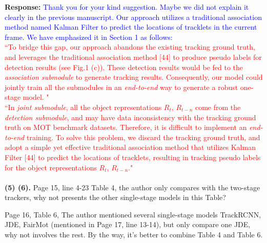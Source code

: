 \documentclass[12pt,journal,onecolumn]{IEEEtran}
\begin{document}
\textbf{Response:} \textcolor{blue}{Thank you for your kind suggestion.
Maybe we did not explain it clearly in the previous manuscript. 
Our approach utilizes a traditional association method named Kalman Filter to predict the locations of tracklets in the current frame. 
We have emphasized it in Section 1 as follows: \\
}
\textcolor{red}{
``To bridge this gap, our approach abandons the existing tracking ground truth, and leverages the traditional association method [44] to produce pseudo labels for detection results (see Fig.1 (c)). 
These detection results would be fed to the \emph{association submodule} to generate tracking results. 
Consequently, our model could jointly train all the submodules in an \emph{end-to-end} way to generate a robust one-stage model. " \\
``In \emph{joint submodule}, all the object representations $R_t$, $R_{t-n}$ come from the \emph{detection submodule}, and may have data inconsistency with the tracking ground truth on MOT benchmark datasets.
Therefore, it is difficult to implement an \emph{end-to-end} training. 
To solve this problem, we discard the tracking ground truth, and adopt a simple yet effective traditional association method that utilizes Kalman Filter [44] to predict the locations of tracklets, resulting in tracking pseudo labels for the object representations $R_t$, $R_{t-n}$."
}
\vspace{8pt} \\ \\




\textbf{(5) (6).} Page 15, line 4-23 Table 4, the author only compares with the two-stage trackers, why not presents the other single-stage models in this Table?

Page 16, Table 6, The author mentioned several single-stage models TrackRCNN, JDE, FairMot (mentioned in Page 17, line 13-14), but only compare one JDE, why not involves the rest. 
By the way, it's better to combine Table 4 and Table 6.

\end{document}
